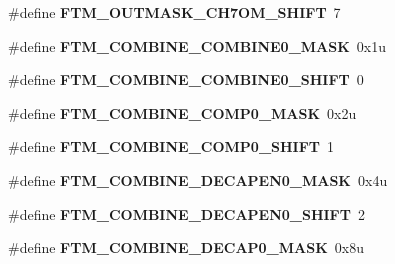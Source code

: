 \begin{DoxyCompactItemize}
\item 
\hypertarget{group___f_t_m___register___masks_gae1b4dc666609c954526cc0f83bf18ce3}{}\#define {\bfseries F\+T\+M\+\_\+\+O\+U\+T\+M\+A\+S\+K\+\_\+\+C\+H7\+O\+M\+\_\+\+S\+H\+I\+F\+T}~7\label{group___f_t_m___register___masks_gae1b4dc666609c954526cc0f83bf18ce3}

\item 
\hypertarget{group___f_t_m___register___masks_gaf48cb997d418c07e063179fa8459c75a}{}\#define {\bfseries F\+T\+M\+\_\+\+C\+O\+M\+B\+I\+N\+E\+\_\+\+C\+O\+M\+B\+I\+N\+E0\+\_\+\+M\+A\+S\+K}~0x1u\label{group___f_t_m___register___masks_gaf48cb997d418c07e063179fa8459c75a}

\item 
\hypertarget{group___f_t_m___register___masks_gabe1e557f9bbddbbe13beac964fa07c1f}{}\#define {\bfseries F\+T\+M\+\_\+\+C\+O\+M\+B\+I\+N\+E\+\_\+\+C\+O\+M\+B\+I\+N\+E0\+\_\+\+S\+H\+I\+F\+T}~0\label{group___f_t_m___register___masks_gabe1e557f9bbddbbe13beac964fa07c1f}

\item 
\hypertarget{group___f_t_m___register___masks_ga4ac7b3d3c5869c8c8af75bdc506e7c81}{}\#define {\bfseries F\+T\+M\+\_\+\+C\+O\+M\+B\+I\+N\+E\+\_\+\+C\+O\+M\+P0\+\_\+\+M\+A\+S\+K}~0x2u\label{group___f_t_m___register___masks_ga4ac7b3d3c5869c8c8af75bdc506e7c81}

\item 
\hypertarget{group___f_t_m___register___masks_ga26f836ae03a05f06608cefafb90082da}{}\#define {\bfseries F\+T\+M\+\_\+\+C\+O\+M\+B\+I\+N\+E\+\_\+\+C\+O\+M\+P0\+\_\+\+S\+H\+I\+F\+T}~1\label{group___f_t_m___register___masks_ga26f836ae03a05f06608cefafb90082da}

\item 
\hypertarget{group___f_t_m___register___masks_ga77c4a4aae8406f791ebfbc82ba85b584}{}\#define {\bfseries F\+T\+M\+\_\+\+C\+O\+M\+B\+I\+N\+E\+\_\+\+D\+E\+C\+A\+P\+E\+N0\+\_\+\+M\+A\+S\+K}~0x4u\label{group___f_t_m___register___masks_ga77c4a4aae8406f791ebfbc82ba85b584}

\item 
\hypertarget{group___f_t_m___register___masks_ga5e5b2330d62feae3345f42df20e7f169}{}\#define {\bfseries F\+T\+M\+\_\+\+C\+O\+M\+B\+I\+N\+E\+\_\+\+D\+E\+C\+A\+P\+E\+N0\+\_\+\+S\+H\+I\+F\+T}~2\label{group___f_t_m___register___masks_ga5e5b2330d62feae3345f42df20e7f169}

\item 
\hypertarget{group___f_t_m___register___masks_ga9d79e8bd8bf1855adbe370ae1499d48d}{}\#define {\bfseries F\+T\+M\+\_\+\+C\+O\+M\+B\+I\+N\+E\+\_\+\+D\+E\+C\+A\+P0\+\_\+\+M\+A\+S\+K}~0x8u\label{group___f_t_m___register___masks_ga9d79e8bd8bf1855adbe370ae1499d48d}


\end{DoxyCompactItemize}

